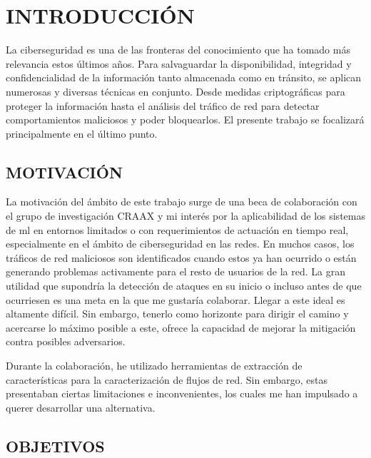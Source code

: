 \newpage
\pagestyle{plain}

\chapter*{INTRODUCCIÓN}

La ciberseguridad es una de las fronteras del conocimiento que ha tomado más relevancia estos últimos años. Para salvaguardar la disponibilidad, integridad y confidencialidad de la información tanto almacenada como en tránsito, se aplican numerosas y diversas técnicas en conjunto. Desde medidas criptográficas para proteger la información hasta el análisis del tráfico de red para detectar comportamientos maliciosos y poder bloquearlos. El presente trabajo se focalizará principalmente en el último punto.

\section*{MOTIVACIÓN}

La motivación del ámbito de este trabajo surge de una beca de colaboración con el grupo de investigación CRAAX y mi interés por la aplicabilidad de los sistemas de \gls{ml} en entornos limitados o con requerimientos de actuación en tiempo real, especialmente en el ámbito de ciberseguridad en las redes. En muchos casos, los tráficos de red maliciosos son identificados cuando estos ya han ocurrido o están generando problemas activamente para el resto de usuarios de la red. La gran utilidad que supondría la detección de ataques en su inicio o incluso antes de que ocurriesen es una meta en la que me gustaría colaborar. Llegar a este ideal es altamente difícil. Sin embargo, tenerlo como horizonte para dirigir el camino y acercarse lo máximo posible a este, ofrece la capacidad de mejorar la mitigación contra posibles adversarios.

Durante la colaboración, he utilizado herramientas de extracción de características para la caracterización de flujos de red. Sin embargo, estas presentaban ciertas limitaciones e inconvenientes, los cuales me han impulsado a querer desarrollar una alternativa.

\section*{OBJETIVOS}

